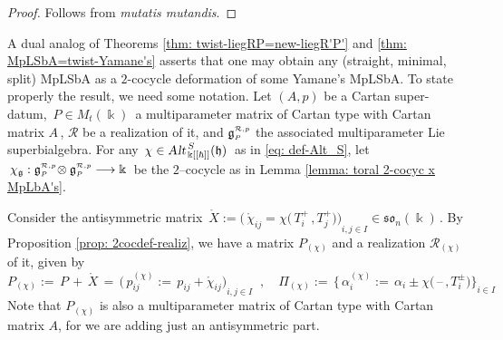 \documentclass[12pt,reqno,twoside,a4paper]{amsart}
\numberwithin{equation}{section}
\theoremstyle{definition}
\newtheorem{free text}[lema]{}
\theoremstyle{remark}
\newcommand{\R}{{\mathcal R}}
\def \kh{{\Bbbk[[\hbar]]}}
\def \Ppicc {{\scriptscriptstyle P}}
\def \lieg{\mathfrak{g}}
\def \liegRpP{\mathfrak{g}^{\raise1pt\hbox{$ \scriptscriptstyle \mathcal{R},p $}}_\Ppicc}
\def \lieh{\mathfrak{h}}
\def \lieso{\mathfrak{so}}
\def \pf{\begin{proof}}
\def \epf{\end{proof}}
\theoremstyle{plain}
\begin{document}
\pf
%
Follows from \cite[Lemma 3.4.2]{GG4} \emph{mutatis mutandis}.
%
\epf

\vskip7pt

   A dual analog of  Theorems \ref{thm: twist-liegRP=new-liegR'P'} and
   \ref{thm: MpLSbA=twist-Yamane's} asserts that one may obtain any (straight,
   minimal, split) MpLSbA
   as a $2$-cocycle deformation of some Yamane's MpLSbA.
   To state properly the result, we need some notation.  Let $(A,p)$ be a Cartan super-datum,
   $ \, P\in M_t(\Bbbk) \, $ a multiparameter matrix of Cartan type with Cartan matrix
   $ A \, $,
   $ \R $  be a realization of it, and
   $ \liegRpP $ the associated multiparameter Lie superbialgebra.
   For any  $ \, \chi \in \text{\sl Alt}_{\,\kh}^{\,S}(\lieh) \, $
   as in  \eqref{eq: def-Alt_S},  let
   $ \, \chi_\lieg : \liegRpP \!\otimes \liegRpP \longrightarrow \Bbbk \, $
   be the  $ 2 $--cocycle  as in Lemma \ref{lemma: toral 2-cocyc x MpLbA's}.

\vskip5pt

   Consider the antisymmetric matrix
   $ \, \mathring{X} := {\Big(\, \mathring{\chi}_{i{}j} = \chi\big(\,T_i^+\,,T_j^+\big) \Big)}_{i, j \in I} \! \in \lieso_n(\Bbbk) \, $.
   By  Proposition \ref{prop: 2cocdef-realiz},  we have a matrix  $ P_{(\chi)} $  and a realization  $ \R_{(\chi)} $  of it,
   given by
  $$
  P_{(\chi)}  := \,  P \, + \, \mathring{X}  \, = \,  {\Big(\, p^{(\chi)}_{i{}j} := \,  p_{ij} + \mathring{\chi}_{i{}j} \Big)}_{\! i, j \in I}  \;\; ,  \quad
   \Pi_{(\chi)}  := \,  {\Big\{\, \alpha_i^{(\chi)}  := \,
   \alpha_i \pm \chi\big(\, \text{--} \, , T_i^\pm \big)  \Big\}}_{i \in I}
   $$
%
 Note that $P_{(\chi)} $ is also a multiparameter matrix of Cartan type with Cartan
 matrix $A$, for we are adding just an antisymmetric part.

\vskip13pt
\end{document}
